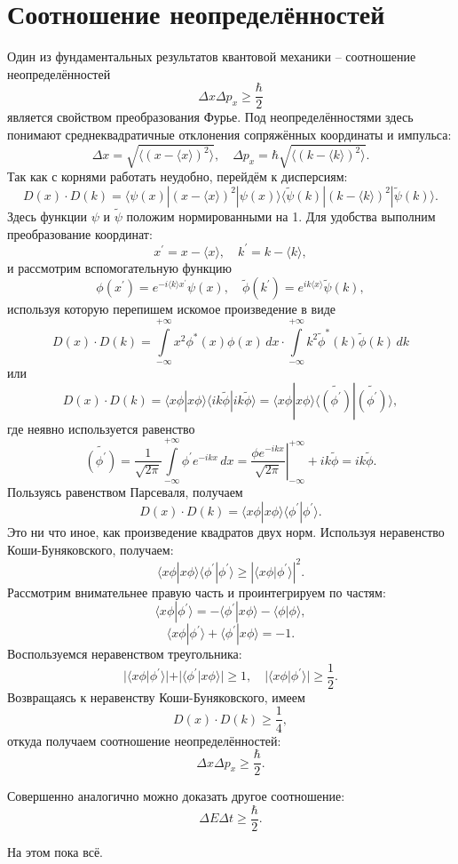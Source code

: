 \section{Соотношение неопределённостей}
Один из фундаментальных результатов квантовой механики -- соотношение
неопределённостей
\[
    \Delta x  \Delta p_x \ge \frac{\hbar}{2}
\]
является свойством преобразования Фурье. Под неопределённостями здесь понимают
среднеквадратичные отклонения сопряжённых координаты и импульса:
\[
    \Delta x = \sqrt{\langle(x-\langle x \rangle)^2\rangle},\quad
    \Delta p_x = \hbar\sqrt{\langle(k-\langle k \rangle)^2\rangle}.
\]
Так как с корнями работать неудобно, перейдём к дисперсиям:
\[
    D(x)\cdot D(k) = \langle\psi(x)|(x-\langle x\rangle)^2|\psi(x)\rangle
    \langle\tilde{\psi}(k)|(k-\langle k \rangle)^2|\tilde{\psi}(k)\rangle.
\]
Здесь функции \( \psi \)  и \( \tilde\psi \) положим нормированными на 1.
Для удобства выполним преобразование координат:
\[
    x^\prime = x - \langle x \rangle,\quad
    k^\prime = k - \langle k \rangle,
\]
и рассмотрим вспомогательную функцию
\[
    \phi(x^\prime) = e^{-i\langle k \rangle x^\prime} \psi(x),\quad
    \tilde{\phi}(k^\prime) = e^{ik\langle x \rangle} \tilde{\psi}(k),
\]
используя которую перепишем искомое произведение в виде
\[
    D(x)\cdot D(k) = \int\limits_{-\infty}^{+\infty} x^2 \phi^\ast(x)\phi(x)
    \,dx\cdot \int\limits_{-\infty}^{+\infty} k^2 \tilde{\phi}^\ast(k)\tilde{\phi}(k)\,dk
\]
или
\[
    D(x)\cdot D(k) = \langle x\phi|x \phi\rangle
    \langle ik\tilde{\phi}|ik \tilde{\phi}\rangle =
    \langle x\phi|x \phi\rangle
    \langle \tilde{\left(\phi^\prime\right)}|\tilde{\left(\phi^\prime\right)}\rangle,
\]
где неявно используется равенство
\[
    \tilde{(\phi^\prime)} = \frac{1}{\sqrt{2\pi}} \int\limits_{-\infty}^{+\infty}
    \phi^\prime e^{-ikx}\,dx =
    \left.\frac{\phi e^{-ikx}}{\sqrt{2\pi}}\right|_{-\infty}^{+\infty}
    +  ik\tilde{\phi} = ik\tilde{\phi}.
\]
Пользуясь равенством Парсеваля, получаем
\[
    D(x)\cdot D(k) = \langle x \phi|x \phi\rangle \langle \phi^\prime | \phi^\prime \rangle.
\]
Это ни что иное, как произведение квадратов двух норм. Используя неравенство
Коши-Буняковского, получаем:
\[
    \langle x\phi|x \phi\rangle
    \langle \phi^\prime|\phi^\prime\rangle \ge
    \left|\langle x\phi | \phi^\prime \rangle\right|^2.
\]
Рассмотрим внимательнее правую часть и проинтегрируем по частям:
\[
    \langle x\phi|\phi^\prime\rangle = -\langle \phi^\prime | x\phi \rangle
    - \langle\phi|\phi\rangle,
\]
\[
    \langle x\phi|\phi^\prime\rangle + \langle\phi^\prime|x\phi\rangle = -1.
\]
Воспользуемся неравенством треугольника:
\[
    |\langle x\phi|\phi^\prime\rangle| + |\langle\phi^\prime|x\phi\rangle| \ge 1,
    \quad
    |\langle x\phi|\phi^\prime\rangle| \ge \frac{1}{2}.
\]
Возвращаясь к неравенству Коши-Буняковского, имеем
\[
    D(x)\cdot D(k) \ge \frac{1}{4},
\]
откуда получаем соотношение неопределённостей:
\[
    \Delta x  \Delta p_x \ge \frac{\hbar}{2}.
\]

Совершенно аналогично можно доказать другое соотношение:
\[
    \Delta E  \Delta t \ge \frac{\hbar}{2}.
\]

На этом пока всё.

